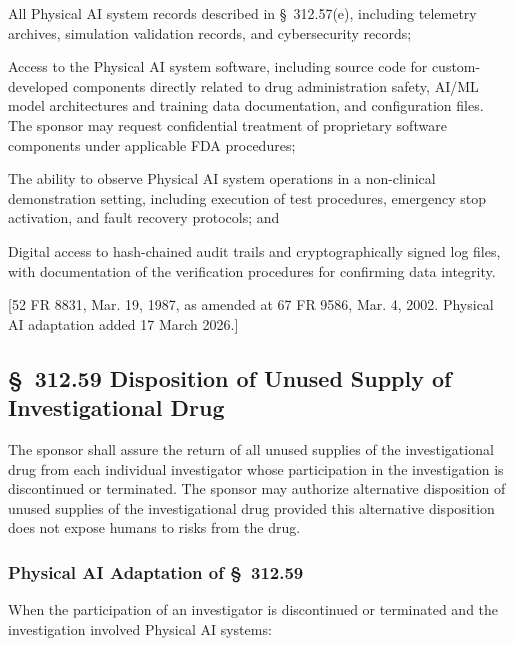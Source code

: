 \documentclass[11pt]{article}
\begin{document}
\begin{description}[leftmargin=0.8cm,style=sameline]
\item[(i)] All Physical AI system records described in \S~312.57(e), including telemetry archives, simulation validation records, and cybersecurity records;
\item[(ii)] Access to the Physical AI system software, including source code for custom-developed components directly related to drug administration safety, AI/ML model architectures and training data documentation, and configuration files. The sponsor may request confidential treatment of proprietary software components under applicable FDA procedures;
\item[(iii)] The ability to observe Physical AI system operations in a non-clinical demonstration setting, including execution of test procedures, emergency stop activation, and fault recovery protocols; and
\item[(iv)] Digital access to hash-chained audit trails and cryptographically signed log files, with documentation of the verification procedures for confirming data integrity.
\end{description}

[52 FR 8831, Mar. 19, 1987, as amended at 67 FR 9586, Mar. 4, 2002. Physical AI adaptation added 17 March 2026.]

\subsection{\S~312.59 Disposition of Unused Supply of Investigational Drug}

The sponsor shall assure the return of all unused supplies of the investigational drug from each individual investigator whose participation in the investigation is discontinued or terminated. The sponsor may authorize alternative disposition of unused supplies of the investigational drug provided this alternative disposition does not expose humans to risks from the drug.

\subsubsection{Physical AI Adaptation of \S~312.59}

When the participation of an investigator is discontinued or terminated and the investigation involved Physical AI systems:
\end{document}

